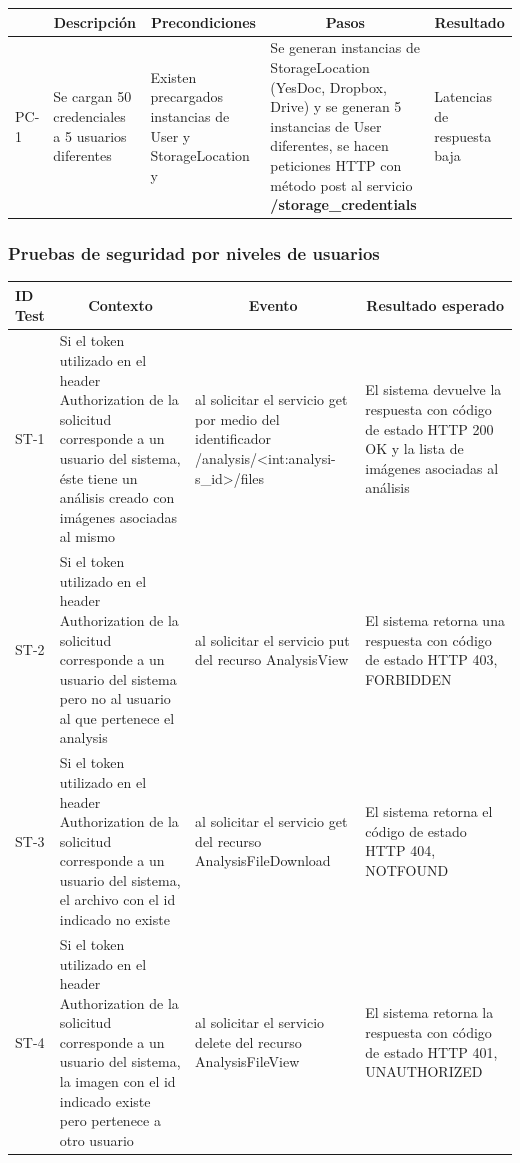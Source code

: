 \begin{longtable}{|p{1cm}|p{3cm}|p{3cm}|p{3.5cm}|p{2.5cm}|}
	\hline \hline
		\rowcolor[gray]{0.9} 
		\multicolumn{1}{|c|}{\textbf{ID}} & \multicolumn{1}{c|}{\textbf{Descripción}} & \multicolumn{1}{c|}{\textbf{Precondiciones}} & \multicolumn{1}{c|}{\textbf{Pasos}} &
		\multicolumn{1}{c|}{\textbf{Resultado}} \\
	\hline
	PC-1 & Se cargan 50 credenciales a 5 usuarios diferentes  & Existen precargados instancias de User y StorageLocation y  & Se generan instancias de StorageLocation (YesDoc, Dropbox, Drive) y se generan 5 instancias de User diferentes, se hacen peticiones HTTP con método post al servicio \textbf{/storage\_credentials} & Latencias de respuesta baja %
	\\ \hline
	
\end{longtable}

\clearpage
\subsubsection{Pruebas de seguridad por niveles de usuarios}

\begin{longtable}{|m{1cm}|p{4cm}|p{4cm}|p{4cm}| }

	\hline
		\rowcolor[gray]{0.9} 
		\textbf{ID Test} & \multicolumn{1}{|c|}{\textbf{Contexto}} & \multicolumn{1}{|c|}{\textbf{Evento}} & \multicolumn{1}{|c|}{\textbf{Resultado esperado}} \\
	\hline
		ST-1 & Si el token utilizado en el header Authorization de la solicitud corresponde a un usuario del sistema, éste tiene un análisis creado con imágenes asociadas al mismo  & al solicitar el servicio get por medio del identificador /analysis/<int:analysi-s\_id>/files & El sistema devuelve la respuesta con código de estado HTTP 200 OK y la lista de imágenes asociadas al análisis\\
	\hline
		ST-2 & Si el token utilizado en el header Authorization de la solicitud corresponde a un usuario del sistema pero no al usuario al que pertenece el analysis & al solicitar el servicio put del recurso AnalysisView & El sistema retorna una respuesta con código de estado HTTP 403, FORBIDDEN\\
	\hline
		ST-3 & Si el token utilizado en el header Authorization de la solicitud corresponde a un usuario del sistema, el archivo con el id indicado no existe & al solicitar el servicio get del recurso AnalysisFileDownload & El sistema retorna el código de estado HTTP 404, NOTFOUND\\
	\hline
		ST-4 & Si el token utilizado en el header Authorization de la solicitud corresponde a un usuario del sistema, la imagen con el id indicado existe pero pertenece a otro usuario  & al solicitar el servicio delete del recurso AnalysisFileView & El sistema retorna la respuesta con código de estado HTTP 401, UNAUTHORIZED\\
	\hline

\end{longtable}

